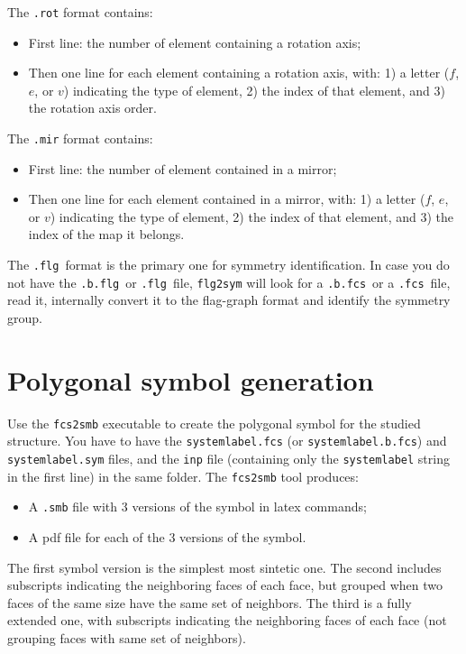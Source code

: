 \documentclass{scrreprt}
\newcommand{\fcs}{\texttt{.fcs}}
\newcommand{\flg}{\texttt{.flg}}
\newcommand{\fcsb}{\texttt{.b.fcs}}
\newcommand{\flgb}{\texttt{.b.flg}}
\begin{document}
The \verb-.rot- format contains:
\begin{itemize}
 \item First line: the number of element containing a rotation axis;
 \item Then one line for each element containing a rotation axis, with: 1) a letter ($f$, $e$, or $v$) indicating the type of element, 2) the index of that element, and 3) the rotation axis order.
\end{itemize}

The \verb-.mir- format contains:
\begin{itemize}
 \item First line: the number of element contained in a mirror;
 \item Then one line for each element contained in a mirror, with: 1) a letter ($f$, $e$, or $v$) indicating the type of element, 2) the index of that element, and 3) the index of the map it belongs.
\end{itemize}

The \flg~format is the primary one for symmetry identification. In case you do not have the \flgb~or \flg~file, \verb-flg2sym- will look for a \fcsb~or a \fcs~file, read it, internally convert it to the flag-graph format and identify the symmetry group.


\section{Polygonal symbol generation}

Use the \verb-fcs2smb- executable to create the polygonal symbol for the studied structure. You have to have the \verb-systemlabel.fcs- (or \verb-systemlabel.b.fcs-) and \verb-systemlabel.sym- files, and the \verb-inp- file (containing only the \verb-systemlabel- string in the first line) in the same folder. The \verb-fcs2smb- tool produces:
\begin{itemize}
 \item A \verb-.smb- file with 3 versions of the symbol in latex commands;
 \item A pdf file for each of the 3 versions of the symbol.
\end{itemize}
The first symbol version is the simplest most sintetic one. The second includes subscripts indicating the neighboring faces of each face, but grouped when two faces of the same size have the same set of neighbors. The third is a fully extended one, with subscripts indicating the neighboring faces of each face (not grouping faces with same set of neighbors).
\end{document}

